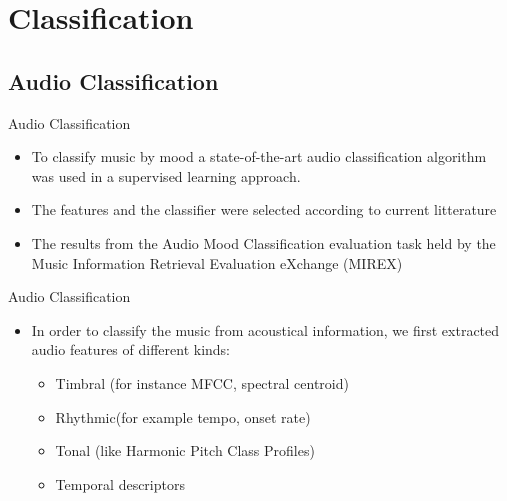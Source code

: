 \documentclass{beamer}
\begin{document}
\section{Classification}

\subsection{Audio Classification}

\begin{frame}{Audio Classification}
  \begin{itemize}
  \item {
    To classify music by mood a state-of-the-art audio classification algorithm was used in a supervised learning approach.
  }
  \item 
  {
  	The features and the classifier were selected according to current litterature
    
  }
  \item 
  {
  	The results from the Audio Mood Classification evaluation task held by the Music Information Retrieval Evaluation eXchange (MIREX)
    
  }
  \end{itemize}
\end{frame}

\begin{frame}{Audio Classification}
  \begin{itemize}
  \item 
  {
    In order to classify the music from acoustical information, we first extracted audio features of different kinds:
    \begin{itemize}
    \item
    {
    	Timbral (for instance MFCC, spectral centroid)
    }
    \item
   	{
   		Rhythmic(for example tempo, onset rate)
   	}
    \item
    {
    	Tonal (like Harmonic Pitch Class Profiles)
    }
    \item
   	{
   		Temporal descriptors
   	}
    \end{itemize}
  }

  
  
  \end{itemize}
\end{frame}
\end{document}
